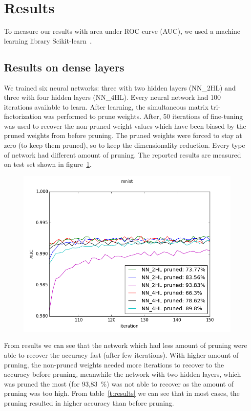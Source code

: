 \documentclass{article} %
\begin{document}
\section{Results}
To measure our results with area under ROC 
curve (AUC), we used a machine
learning library Scikit-learn~\cite{scikit-learn}.

\subsection{Results on dense layers}
We trained six neural networks: 
three with two hidden layers (NN\_2HL) and three with four 
hidden layers (NN\_4HL). Every neural network had 100 iterations available to learn. After 
learning, the simultaneous matrix tri-factorization was performed to prune 
weights. After, 50 iterations of fine-tuning was used to recover the non-pruned 
weight values which have been biased by the pruned weights from before 
pruning. The pruned weights were forced to stay at zero (to keep 
them pruned), so to keep the dimensionality reduction. 
Every type of network had different amount of pruning. 
The reported results are measured  on test set 
shown in figure~\ref{f:results}. 

\begin{figure}[!ht]
\centering
\includegraphics[width=0.8\linewidth]{mnist_new.png}
\label{f:results}
\end{figure}

From results we can see 
that the network which had less amount of pruning were able to recover the 
accuracy fast (after few iterations). With higher amount of pruning, 
the non-pruned weights needed more iterations to recover to the accuracy before 
pruning, meanwhile the network with two hidden layers, which was pruned the most 
(for 93,83~\%) was not able to recover as the amount of pruning was too high.
From table~\ref{t:results} we can see that in most cases, the pruning resulted
in higher accuracy than before pruning. 
\end{document}
